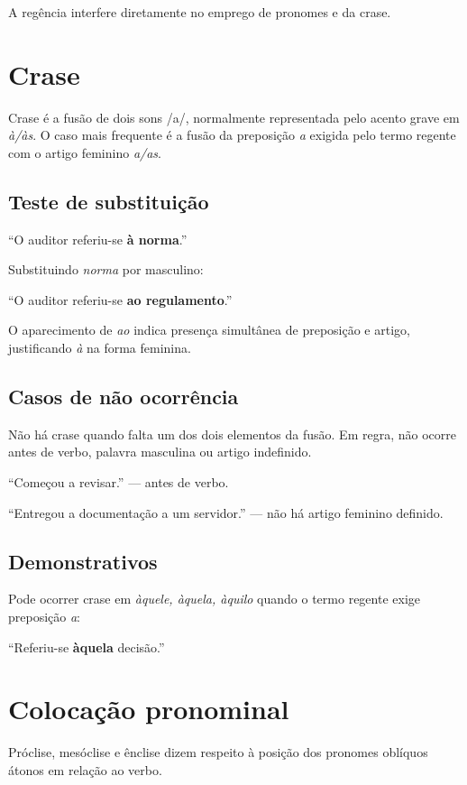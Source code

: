 A regência interfere diretamente no emprego de pronomes e da crase.

\section{Crase}

Crase é a fusão de dois sons /a/, normalmente representada pelo acento grave em \emph{à/às}. O caso mais frequente é a fusão da preposição \emph{a} exigida pelo termo regente com o artigo feminino \emph{a/as}.

\subsection{Teste de substituição}

``O auditor referiu-se \textbf{à norma}.''

Substituindo \emph{norma} por masculino:

``O auditor referiu-se \textbf{ao regulamento}.''

O aparecimento de \emph{ao} indica presença simultânea de preposição e artigo, justificando \emph{à} na forma feminina.

\subsection{Casos de não ocorrência}

Não há crase quando falta um dos dois elementos da fusão. Em regra, não ocorre antes de verbo, palavra masculina ou artigo indefinido.

``Começou a revisar.'' — antes de verbo.

``Entregou a documentação a um servidor.'' — não há artigo feminino definido.

\subsection{Demonstrativos}

Pode ocorrer crase em \emph{àquele, àquela, àquilo} quando o termo regente exige preposição \emph{a}:

``Referiu-se \textbf{àquela} decisão.''

\section{Colocação pronominal}

Próclise, mesóclise e ênclise dizem respeito à posição dos pronomes oblíquos átonos em relação ao verbo.

